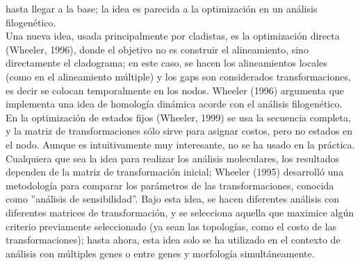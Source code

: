 hasta llegar a la base; la idea es parecida a la optimizaci\'on en un an\'alisis filogen\'etico.\\
Una nueva idea, usada principalmente por cladistas, es la optimizaci\'on directa (Wheeler, 1996), donde el 
objetivo no es construir el alineamiento, sino directamente el cladograma; en este caso, se hacen los alineamientos locales 
(como en el alineamiento m\'ultiple) y los gaps son considerados transformaciones, es decir se colocan temporalmente en 
los nodos. Wheeler (1996) argumenta que implementa una idea de homolog\'ia din\'amica acorde con el an\'alisis filogen\'etico. 
En la optimizaci\'on de estados fijos (Wheeler, 1999) se usa la secuencia completa, y la matriz de transformaciones s\'olo 
sirve para asignar costos, pero no estados en el nodo.  Aunque es intuitivamente muy 
interesante, no se ha usado en la pr\'actica. Cualquiera que sea la idea para realizar los an\'alisis moleculares, los 
resultados dependen de la matriz de transformaci\'on inicial; Wheeler (1995) desarroll\'o una metodolog\'ia para comparar 
los par\'ametros de las transformaciones, conocida como ''an\'alisis de sensibilidad''.
Bajo esta idea, se hacen diferentes an\'alisis con diferentes matrices de transformaci\'on, y se selecciona aquella que 
maximice alg\'un criterio previamente seleccionado (ya sean las topolog\'ias, como el costo de las transformaciones); hasta 
ahora, esta idea solo se ha utilizado en el contexto de an\'alisis con m\'ultiples genes o entre genes y morfolog\'ia 
simult\'aneamente.
